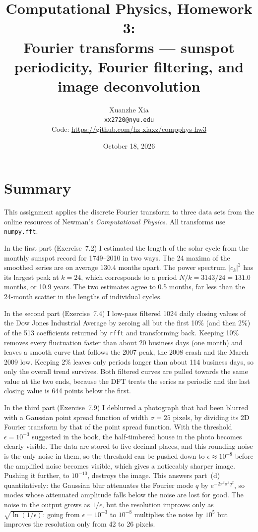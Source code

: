 \documentclass[11pt]{article}
\title{Computational Physics, Homework 3:\\
Fourier transforms --- sunspot periodicity, Fourier filtering,
and image deconvolution}
\author{Xuanzhe Xia \\ \texttt{xx2720@nyu.edu} \\[4pt]
\small Code: \url{https://github.com/hz-xiaxz/compphys-hw3}}
\date{October 18, 2026}
\newcommand{\eps}{\epsilon}
\newcommand{\code}[1]{\texttt{#1}}
\begin{document}
\maketitle

\section*{Summary}

This assignment applies the discrete Fourier transform to three data sets from
the online resources of Newman's \emph{Computational Physics}. All transforms
use \code{numpy.fft}.

In the first part (Exercise~7.2) I estimated the length of the solar cycle from
the monthly sunspot record for 1749--2010 in two ways. The 24 maxima of the
smoothed series are on average 130.4 months apart. The power spectrum
$|c_k|^2$ has its largest peak at $k=24$, which corresponds to a period
$N/k = 3143/24 = 131.0$ months, or 10.9 years. The two estimates agree to
0.5 months, far less than the 24-month scatter in the lengths of individual
cycles.

In the second part (Exercise~7.4) I low-pass filtered 1024 daily closing values
of the Dow Jones Industrial Average by zeroing all but the first 10\% (and then
2\%) of the 513 coefficients returned by \code{rfft} and transforming back. Keeping
10\% removes every fluctuation faster than about 20 business days (one month)
and leaves a smooth curve that follows the 2007 peak, the 2008 crash and the
March 2009 low. Keeping 2\% leaves only periods longer than about 114 business
days, so only the overall trend survives. Both filtered curves are pulled
towards the same value at the two ends, because the DFT treats the series as
periodic and the last closing value is 644 points below the first.

In the third part (Exercise~7.9) I deblurred a photograph that had been blurred
with a Gaussian point spread function of width $\sigma=25$ pixels, by dividing
its 2D Fourier transform by that of the point spread function. With the
threshold $\eps=10^{-3}$ suggested in the book, the half-timbered house in the
photo becomes clearly visible. The data are stored to five decimal places, and
this rounding noise is the only noise in them, so the threshold can be pushed
down to $\eps\approx10^{-8}$ before the amplified noise becomes visible, which
gives a noticeably sharper image. Pushing it further, to $10^{-10}$, destroys the
image. This answers part~(d) quantitatively: the Gaussian blur attenuates the
Fourier mode $q$ by $e^{-2\pi^2\sigma^2q^2}$, so modes whose attenuated amplitude
falls below the noise are lost for good. The noise in the output grows as
$1/\eps$, but the resolution improves only as $\sqrt{\ln(1/\eps)}$: going from
$\eps=10^{-3}$ to $10^{-8}$ multiplies the noise by $10^5$ but improves the
resolution only from 42 to 26 pixels.
\end{document}

